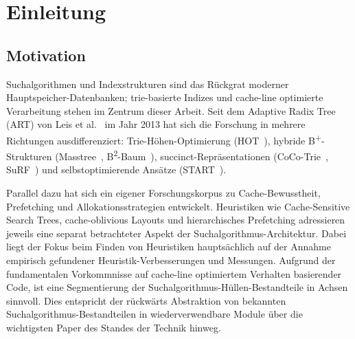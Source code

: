 \chapter{Einleitung}\label{ch:intro}

\section{Motivation}\label{sec:motivation}

Suchalgorithmen und Indexstrukturen sind das Rückgrat moderner Hauptspeicher-Datenbanken;
trie-basierte Indizes und cache-line optimierte Verarbeitung stehen im Zentrum dieser Arbeit. Seit
dem Adaptive Radix Tree (ART) von Leis et al.~\cite{leis2013art} im Jahr 2013 hat sich die Forschung
in mehrere Richtungen ausdifferenziert: Trie-Höhen-Optimierung (HOT~\cite{binna2018hot}), hybride
B\textsuperscript{+}-Strukturen (Masstree~\cite{mao2012masstree},
B\textsuperscript{2}-Baum~\cite{schmeisser2022b2tree}), succinct-Repräsentationen
(CoCo-Trie~\cite{boffa2024coco}, SuRF~\cite{zhang2018surf}) und selbstoptimierende Ansätze
(START~\cite{fent2020start}).

Parallel dazu hat sich ein eigener Forschungskorpus zu Cache-Bewusstheit, Prefetching und
Allokationsstrategien entwickelt. Heuristiken wie Cache-Sensitive Search Trees, cache-oblivious
Layouts und hierarchisches Prefetching adressieren jeweils eine separat betrachteter Aspekt der
Suchalgorithmus-Architektur. Dabei liegt der Fokus beim Finden von Heuristiken hauptsächlich auf der
Annahme empirisch gefundener Heuristik-Verbesserungen und Messungen. Aufgrund der fundamentalen
Vorkommnisse auf cache-line optimiertem Verhalten basierender Code, ist eine Segmentierung der
Suchalgorithmus-Hüllen-Bestandteile in Achsen sinnvoll. Dies entspricht der rückwärts Abstraktion
von bekannten Suchalgorithmus-Bestandteilen in wiederverwendbare Module über die wichtigsten Paper
des Standes der Technik hinweg.

